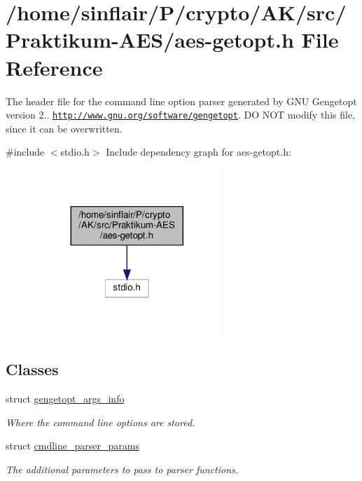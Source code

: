 \hypertarget{aes-getopt_8h}{}\section{/home/sinflair/\+P/crypto/\+A\+K/src/\+Praktikum-\/\+A\+E\+S/aes-\/getopt.h File Reference}
\label{aes-getopt_8h}


The header file for the command line option parser generated by G\+NU Gengetopt version 2.. \href{http://www.gnu.org/software/gengetopt}{\tt http\+://www.\+gnu.\+org/software/gengetopt}. DO N\+OT modify this file, since it can be overwritten.  


{\ttfamily \#include $<$stdio.\+h$>$}\newline
Include dependency graph for aes-\/getopt.h\+:
\nopagebreak
\begin{figure}[H]
\begin{center}
\leavevmode
\includegraphics[width=200pt]{aes-getopt_8h__incl}
\end{center}
\end{figure}
\subsection*{Classes}
\begin{DoxyCompactItemize}
\item 
struct \hyperlink{structgengetopt__args__info}{gengetopt\+\_\+args\+\_\+info}
\begin{DoxyCompactList}\small\item\em Where the command line options are stored. \end{DoxyCompactList}\item 
struct \hyperlink{structcmdline__parser__params}{cmdline\+\_\+parser\+\_\+params}
\begin{DoxyCompactList}\small\item\em The additional parameters to pass to parser functions. \end{DoxyCompactList}\end{DoxyCompactItemize}
